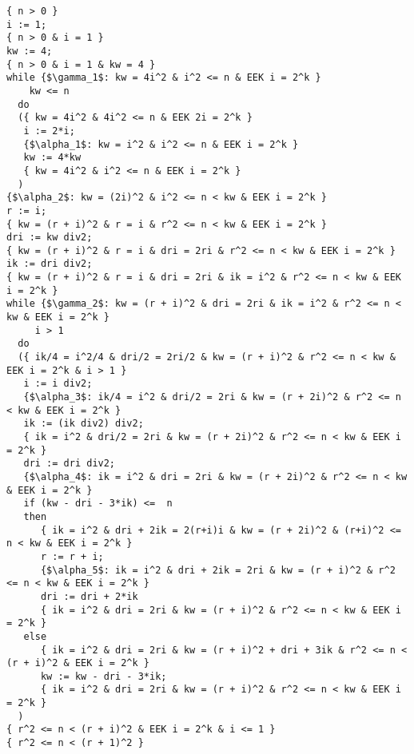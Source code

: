 \documentclass[final,12pt]{article}
\begin{document}
\begin{lstlisting}
{ n > 0 }
i := 1;
{ n > 0 & i = 1 }
kw := 4;
{ n > 0 & i = 1 & kw = 4 }
while {$\gamma_1$: kw = 4i^2 & i^2 <= n & EEK i = 2^k }
    kw <= n
  do
  ({ kw = 4i^2 & 4i^2 <= n & EEK 2i = 2^k }
   i := 2*i;
   {$\alpha_1$: kw = i^2 & i^2 <= n & EEK i = 2^k }
   kw := 4*kw
   { kw = 4i^2 & i^2 <= n & EEK i = 2^k }
  )
{$\alpha_2$: kw = (2i)^2 & i^2 <= n < kw & EEK i = 2^k }
r := i;
{ kw = (r + i)^2 & r = i & r^2 <= n < kw & EEK i = 2^k }
dri := kw div2;
{ kw = (r + i)^2 & r = i & dri = 2ri & r^2 <= n < kw & EEK i = 2^k }
ik := dri div2;
{ kw = (r + i)^2 & r = i & dri = 2ri & ik = i^2 & r^2 <= n < kw & EEK i = 2^k }
while {$\gamma_2$: kw = (r + i)^2 & dri = 2ri & ik = i^2 & r^2 <= n < kw & EEK i = 2^k }
     i > 1
  do
  ({ ik/4 = i^2/4 & dri/2 = 2ri/2 & kw = (r + i)^2 & r^2 <= n < kw & EEK i = 2^k & i > 1 }
   i := i div2;
   {$\alpha_3$: ik/4 = i^2 & dri/2 = 2ri & kw = (r + 2i)^2 & r^2 <= n < kw & EEK i = 2^k }
   ik := (ik div2) div2;
   { ik = i^2 & dri/2 = 2ri & kw = (r + 2i)^2 & r^2 <= n < kw & EEK i = 2^k }
   dri := dri div2;
   {$\alpha_4$: ik = i^2 & dri = 2ri & kw = (r + 2i)^2 & r^2 <= n < kw & EEK i = 2^k }
   if (kw - dri - 3*ik) <=  n
   then
      { ik = i^2 & dri + 2ik = 2(r+i)i & kw = (r + 2i)^2 & (r+i)^2 <= n < kw & EEK i = 2^k }
      r := r + i;
      {$\alpha_5$: ik = i^2 & dri + 2ik = 2ri & kw = (r + i)^2 & r^2 <= n < kw & EEK i = 2^k }
      dri := dri + 2*ik
      { ik = i^2 & dri = 2ri & kw = (r + i)^2 & r^2 <= n < kw & EEK i = 2^k }
   else
      { ik = i^2 & dri = 2ri & kw = (r + i)^2 + dri + 3ik & r^2 <= n < (r + i)^2 & EEK i = 2^k }
      kw := kw - dri - 3*ik;
      { ik = i^2 & dri = 2ri & kw = (r + i)^2 & r^2 <= n < kw & EEK i = 2^k }
  )
{ r^2 <= n < (r + i)^2 & EEK i = 2^k & i <= 1 }
{ r^2 <= n < (r + 1)^2 }
\end{lstlisting}
\end{document}

